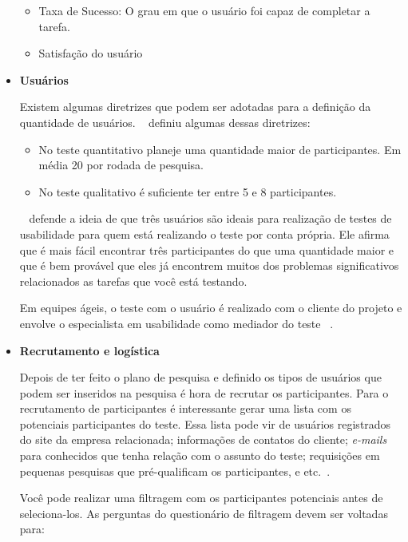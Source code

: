 \begin{itemize}
	\begin{itemize}
		\item Taxa de Sucesso: O grau em que o usuário foi capaz de completar a tarefa.
		\item Satisfação do usuário
	\end{itemize}
	

\item \textbf{Usuários}

Existem algumas diretrizes que podem ser adotadas para a definição da quantidade de usuários. ~ definiu algumas dessas diretrizes:

\begin{itemize}
\item No teste quantitativo planeje uma quantidade maior de participantes. Em média 20 por rodada de pesquisa.
\item No teste qualitativo é suficiente ter entre 5 e 8 participantes.
\end{itemize}

	 ~ defende a ideia de que três usuários são ideais para realização de testes de usabilidade para quem está realizando o teste por conta própria. Ele afirma que é mais fácil encontrar três participantes do que uma quantidade maior e que é bem provável que eles já encontrem muitos dos problemas significativos relacionados as tarefas que você está testando.

	Em equipes ágeis, o teste com o usuário é realizado com o cliente do projeto e envolve o especialista em usabilidade como mediador do teste ~\cite{santos2012}.

\item \textbf{Recrutamento e logística}

Depois de ter feito o plano de pesquisa e definido os tipos de usuários que podem ser inseridos na pesquisa é hora de recrutar os participantes.
Para o recrutamento de participantes é interessante gerar uma lista com os potenciais participantes do teste. Essa lista pode vir de usuários registrados do site da empresa relacionada; informações de contatos do cliente; \textit{e-mails} para conhecidos que tenha relação com o assunto do teste; requisições em pequenas pesquisas que pré-qualificam os participantes, e etc.~\cite{unger2009}.

Você pode realizar uma filtragem com os participantes potenciais antes de seleciona-los. As perguntas do questionário de filtragem devem ser voltadas para:


\end{itemize}
